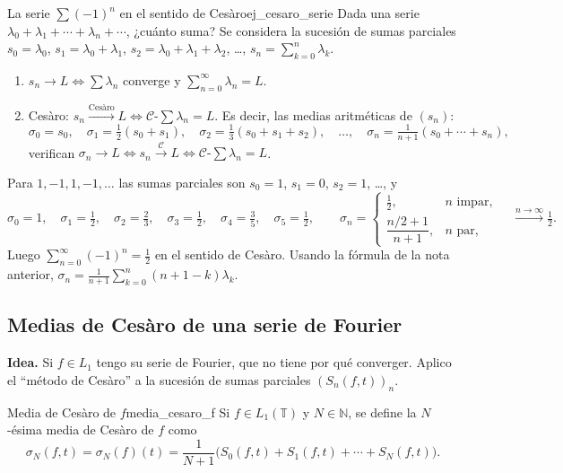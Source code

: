 \begin{ejemplo}{La serie $\sum (-1)^n$ en el sentido de Cesàro}{ej_cesaro_serie}
Dada una serie $\lambda_0 + \lambda_1 + \cdots + \lambda_n + \cdots$, ¿cuánto suma? Se considera la sucesión de sumas parciales $s_0 = \lambda_0$, $s_1 = \lambda_0 + \lambda_1$, $s_2 = \lambda_0+\lambda_1+\lambda_2$, \dots, $s_n = \sum_{k=0}^n \lambda_k$.
\begin{enumerate}
\item[(a)] $s_n \to L \iff \sum \lambda_n$ converge y $\sum_{n=0}^\infty \lambda_n = L$.
\item[(b)] Cesàro: $s_n \xrightarrow{\text{Cesàro}} L \iff \mathcal{C}\text{-}\sum \lambda_n = L$. Es decir, las medias aritméticas de $(s_n)$:
\[
\sigma_0 = s_0, \quad \sigma_1 = \tfrac{1}{2}(s_0+s_1), \quad \sigma_2 = \tfrac{1}{3}(s_0+s_1+s_2), \quad \dots, \quad \sigma_n = \tfrac{1}{n+1}(s_0+\cdots+s_n),
\]
verifican $\sigma_n \to L \iff s_n \xrightarrow{\mathcal{C}} L \iff \mathcal{C}\text{-}\sum \lambda_n = L$.
\end{enumerate}

Para $1,-1,1,-1,\dots$ las sumas parciales son $s_0 = 1$, $s_1 = 0$, $s_2 = 1$, \dots, y
\[
\sigma_0 = 1, \quad \sigma_1 = \tfrac{1}{2}, \quad \sigma_2 = \tfrac{2}{3}, \quad \sigma_3 = \tfrac{1}{2}, \quad \sigma_4 = \tfrac{3}{5}, \quad \sigma_5 = \tfrac{1}{2}, \qquad \sigma_n = \begin{cases} \tfrac{1}{2}, & n \text{ impar}, \\[0.5ex] \dfrac{n/2+1}{n+1}, & n \text{ par}, \end{cases} \quad \xrightarrow{n\to\infty} \tfrac{1}{2}.
\]
Luego $\displaystyle\sum_{n=0}^\infty (-1)^n = \tfrac{1}{2}$ en el sentido de Cesàro. Usando la fórmula de la nota anterior, $\sigma_n = \frac{1}{n+1}\sum_{k=0}^n (n+1-k)\lambda_k$.
\end{ejemplo}

\subsection{Medias de Cesàro de una serie de Fourier}

\textbf{Idea.} Si $f \in L_1$ tengo su serie de Fourier, que no tiene por qué converger. Aplico el ``método de Cesàro'' a la sucesión de sumas parciales $(S_n(f,t))_n$.

\begin{definicion}{Media de Cesàro de $f$}{media_cesaro_f}
Si $f \in L_1(\mathbb{T})$ y $N \in \mathbb{N}$, se define la $N$-ésima media de Cesàro de $f$ como
\[
\sigma_N(f,t) = \sigma_N(f)(t) = \frac{1}{N+1}\Big( S_0(f,t) + S_1(f,t) + \cdots + S_N(f,t) \Big).
\]
\end{definicion}

